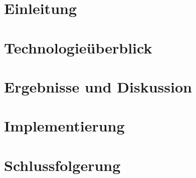 \documentclass[a4paper,UKenglish,compactauthor]{lipics-v2021}
\begin{document}
\small\normalsize

\cleardoublepage



\setcounter{page}{1}

\section{Einleitung}
\label{sec:introduction}


\section{Technologieüberblick}
\label{sec:Technologieüberblick}


\section{Ergebnisse und Diskussion}
\label{sec:ergebnisse}


\section{Implementierung}
\label{sec:Implementierung}


\section{Schlussfolgerung}
\label{sec:Schlussfolgerung}

\end{document}
